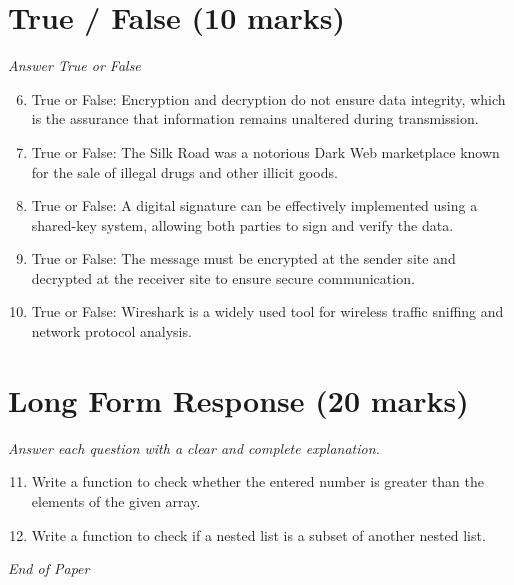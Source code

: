 \documentclass[12pt]{article}
\begin{document}
\section*{True / False (10 marks)}
\textit{Answer True or False}
\begin{enumerate}[label=\arabic*.]
\setcounter{enumi}{5}
\item True or False: Encryption and decryption do not ensure data integrity, which is the assurance that information remains unaltered during transmission.
\item True or False: The Silk Road was a notorious Dark Web marketplace known for the sale of illegal drugs and other illicit goods.
\item True or False: A digital signature can be effectively implemented using a shared-key system, allowing both parties to sign and verify the data.
\item True or False: The message must be encrypted at the sender site and decrypted at the receiver site to ensure secure communication.
\item True or False: Wireshark is a widely used tool for wireless traffic sniffing and network protocol analysis.
\end{enumerate}

\section*{Long Form Response (20 marks)}
\textit{Answer each question with a clear and complete explanation.}
\begin{enumerate}[label=\arabic*.]
\setcounter{enumi}{10}
\item Write a function to check whether the entered number is greater than the elements of the given array.
\item Write a function to check if a nested list is a subset of another nested list.
\end{enumerate}

\vfill
\noindent\textit{End of Paper}
\end{document}
